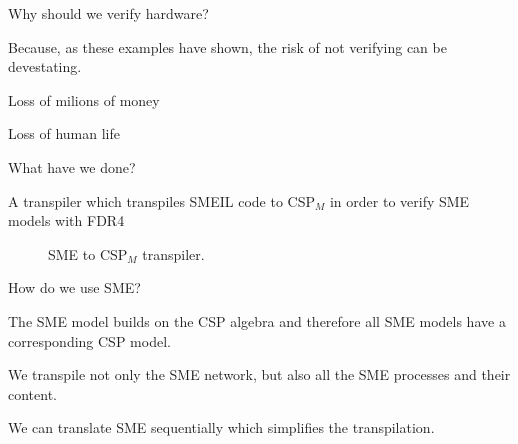 \documentclass[13pt]{beamer}
\newcommand{\cspm}{CSP$_M$}
\begin{document}
\begin{frame}{Why should we verify hardware?}
    \begin{block}{}
        Because, as these examples have shown, the risk of not verifying can be devestating.
            \vspace{5mm}

        Loss of milions of money
            \vspace{5mm}

        Loss of human life
    \end{block}
\end{frame}
%
\begin{frame}{What have we done?}
 \begin{block}{}
   A transpiler which transpiles SMEIL code to \cspm{} in order to verify SME models with FDR4
 \begin{figure}[!ht]
  \centering
  \caption{SME to \cspm{} transpiler.}
  \label{fig:sme-to-cspm}
\end{figure}
 \end{block}
\end{frame}
%
\begin{frame}{How do we use SME?}
 \begin{block}{}
   The SME model builds on the CSP algebra and therefore all SME models have a corresponding CSP model.

 \end{block}

 \pause

  \begin{block}{}
    We transpile not only the SME network, but also all the SME processes and their content.
  \end{block}

 \pause

  \begin{block}{}
    We can translate SME sequentially which simplifies the transpilation.
  \end{block}
\end{frame}
\end{document}
